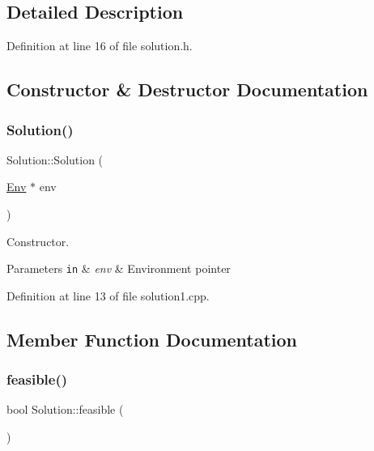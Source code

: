 \subsection{Detailed Description}


Definition at line 16 of file solution.\+h.



\subsection{Constructor \& Destructor Documentation}
\mbox{\label{class_solution_a3bdbdf455adecf7ab0f71bbce1efad66}} 
\subsubsection{\texorpdfstring{Solution()}{Solution()}}
{\footnotesize\ttfamily Solution\+::\+Solution (\begin{DoxyParamCaption}\item[{\hyperlink{class_env}{Env} $\ast$}]{env }\end{DoxyParamCaption})}



Constructor. 


\begin{DoxyParams}[1]{Parameters}
\mbox{\tt in}  & {\em env} & Environment pointer \\
\hline
\end{DoxyParams}


Definition at line 13 of file solution1.\+cpp.



\subsection{Member Function Documentation}
\mbox{\label{class_solution_a13e4ebdccdbc8c572a82fb21254022d0}} 
\subsubsection{\texorpdfstring{feasible()}{feasible()}}
{\footnotesize\ttfamily bool Solution\+::feasible (\begin{DoxyParamCaption}{ }\end{DoxyParamCaption})}



